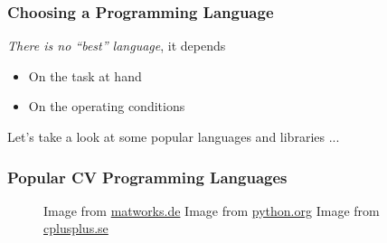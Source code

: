 \documentclass[xetex,professionalfont]{beamer}
\begin{document}

\begin{frame}
\frametitle{Choosing a Programming Language}

\emph{There is no \enquote{best} language}, it depends
\begin{itemize}
	\item On the task at hand %
	\item On the operating conditions %
\end{itemize}

\bigskip
Let's take a look at some popular languages and libraries ...

\end{frame}


\begin{frame}
\frametitle{Popular CV Programming Languages}

\begin{figure}
\centering
{
	{\centering Image from \url{matworks.de}}}\quad
{
	{\centering Image from \url{python.org}}}\quad
{
	{\centering Image from \url{cplusplus.se}}}
\end{figure}

\end{frame}

\end{document}
